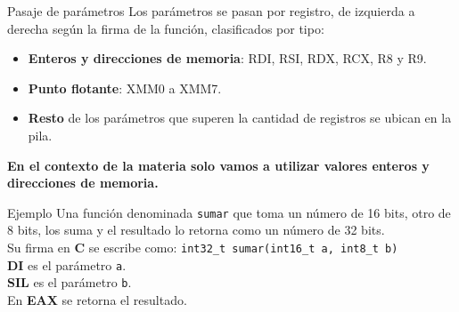 \documentclass[aspectratio=169]{beamer}
\begin{document}
\begin{frame}[fragile]{Pasaje de parámetros}
    Los parámetros se pasan por registro, de izquierda a derecha según la firma de la función,
    clasificados por tipo:
    \begin{itemize}
    \item \textbf{Enteros y direcciones de memoria}: RDI, RSI, RDX, RCX, R8 y R9.
    \item \textbf{Punto flotante}: XMM0 a XMM7.
    \item \textbf{Resto} de los parámetros que superen la cantidad de registros se ubican en la pila.
    \end{itemize}
    \begin{center}
    \textbf{\textcolor{verdeuca}{En el contexto de la materia solo vamos a utilizar valores enteros y direcciones de memoria.}}
    \end{center}
    \small
    \pause
    \begin{block}{Ejemplo}
    Una función denominada \textcolor{naranjauca}{\texttt{sumar}} que toma un número de 16 bits, otro de 8 bits, los suma y el resultado lo retorna como un número de 32 bits.\\
    Su firma en \textbf{C} se escribe como: \textcolor{naranjauca}{\texttt{int32\_t sumar(int16\_t a, int8\_t b)}}\\
    \textbf{DI} es el parámetro \textcolor{naranjauca}{\texttt{a}}.\\
    \textbf{SIL} es el parámetro \textcolor{naranjauca}{\texttt{b}}.\\
    En \textbf{EAX} se retorna el resultado.
    \end{block}
\end{frame}
\end{document}
